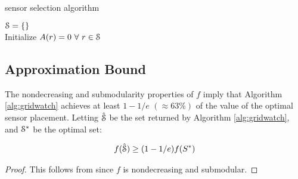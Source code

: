 \begin{algorithm}[h!] 
	\caption{\method sensor selection algorithm \label{alg:gridwatch}}
	$\S = \{\}$ \\
	Initialize $A(r)=0 \ \forall\ r \in \S$ \hfill {}\\ 
\end{algorithm}


\subsection{Approximation Bound}

The nondecreasing and submodularity properties of $f$ imply that Algorithm \ref{alg:gridwatch} achieves at least $1-1/e$ $(\approx 63\%)$ of the value of the optimal sensor placement. Letting $\hat{\S}$ be the set returned by Algorithm \ref{alg:gridwatch}, and $\S^*$ be the optimal set:
\begin{theorem}
\begin{align}
f(\hat{\S}) \ge (1-1/e) f(S^*)
\end{align}
\end{theorem}
\begin{proof}
This follows from \cite{nemhauser1978analysis} since $f$ is nondecreasing and submodular. 
\end{proof}



